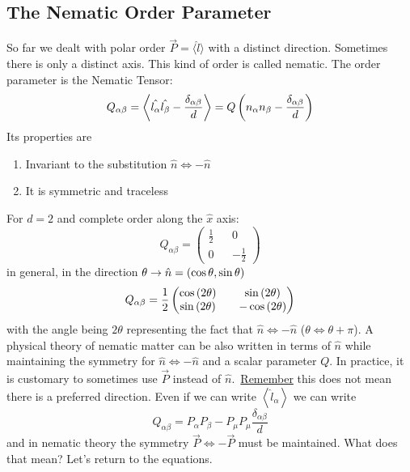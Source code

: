 \subsection{The Nematic Order Parameter}
So far we dealt with polar order \(\vec{P} = \langle\hat l\rangle \) with a distinct direction. Sometimes there is only a distinct axis. This kind of order is called nematic. The order parameter is the Nematic Tensor:
\begin{equation}
    Q_{\alpha\beta} = \left\langle\hat{l_\alpha}\hat{l_\beta}-\frac{\delta_{\alpha\beta}}{d}\right\rangle = Q\left(n_\alpha n_\beta-\frac{\delta_{\alpha\beta}}{d}\right)
\end{equation}
Its properties are
\begin{enumerate}
    \item Invariant to the substitution \(\hat{n} \iff -\hat{n}\)
    \item It is symmetric and traceless
\end{enumerate}
For \(d=2\) and complete order along the \(\hat{x}\) axis:
\begin{equation}
    Q_{\alpha\beta} = \begin{pmatrix}
        \frac{1}{2} && 0 \\ 0 && -\frac{1}{2}
    \end{pmatrix}
\end{equation}
in general, in the direction \(\theta \rightarrow \hat{n}=\left(\cos\theta,\sin\theta\right)\)
\begin{equation}
    Q_{\alpha\beta} = \frac{1}{2}\begin{pmatrix}
        \cos\left(2\theta\right) && \sin\left(2\theta\right) \\ \sin\left(2\theta\right) && -\cos\left(2\theta\right)
    \end{pmatrix}
\end{equation}
with the angle being \(2\theta \) representing the fact that \(\hat{n}\iff-\hat{n}\) (\(\theta\iff\theta+\pi \)). A physical theory of nematic matter can be also written in terms of \(\hat{n}\) while maintaining the symmetry for \(\hat{n}\iff-\hat{n}\) and a scalar parameter \(Q\). In practice, it is customary to sometimes use \(\vec{P}\) instead of \(\hat{n}\).\ \underline{Remember} this does not mean there is a preferred direction. Even if we can write \(\left\langle\hat{l}_\alpha\right\rangle \) we can write
\begin{equation}
    Q_{\alpha\beta} = P_\alpha P_\beta -P_\mu P_\mu \frac{\delta_{\alpha\beta}}{d}
\end{equation}
and in nematic theory the symmetry \(\vec{P}\iff-\vec{P}\) must be maintained. What does that mean? Let's return to the equations.
